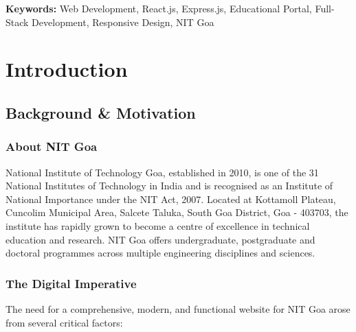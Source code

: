 \documentclass[12pt,a4paper]{report}
\begin{document}
\noindent\textbf{Keywords:} Web Development, React.js, Express.js, Educational Portal, Full-Stack Development, Responsive Design, NIT Goa

\newpage
\tableofcontents

\newpage
\listoffigures

\newpage
\listoftables

\chapter{Introduction}

\section{Background \& Motivation}

\subsection*{About NIT Goa}

National Institute of Technology Goa, established in 2010, is one of the 31 National Institutes of Technology in India and is recognised as an Institute of National Importance under the NIT Act, 2007. Located at Kottamoll Plateau, Cuncolim Municipal Area, Salcete Taluka, South Goa District, Goa - 403703, the institute has rapidly grown to become a centre of excellence in technical education and research. NIT Goa offers undergraduate, postgraduate and doctoral programmes across multiple engineering disciplines and sciences.

\subsection*{The Digital Imperative}

The need for a comprehensive, modern, and functional website for NIT Goa arose from several critical factors:
\end{document}
